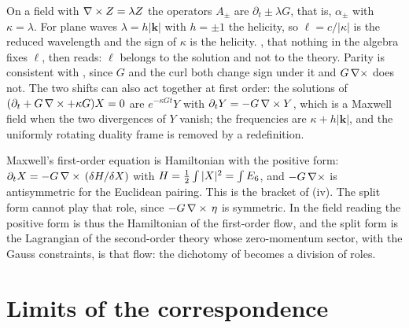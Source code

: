 \begin{remark}
\label{rem:rate}
On a field with $\nabla\times Z=\lambda Z$ the operators $A_\pm$ are $\partial_t\pm\lambda G$, that is, $\alpha_\pm$ with $\kappa=\lambda$. For
plane waves $\lambda=h|\mathbf k|$ with $h=\pm1$ the helicity, so $\ell=c/|\kappa|$ is the reduced wavelength and the sign of $\kappa$ is
the helicity. , that nothing in the algebra fixes $\ell$, then reads: $\ell$ belongs to the solution and not to the theory.
Parity is consistent with , since $G$ and the curl both change sign under it and $G\,\nabla\times$ does not. The two shifts can also
act together at first order: the solutions of $(\partial_t+G\,\nabla\times+\kappa G)X=0$ are $e^{-\kappa Gt}Y$ with $\partial_tY=-G\,\nabla\times Y$,
which is a Maxwell field when the two divergences of $Y$ vanish; the frequencies are $\kappa+h|\mathbf k|$, and the uniformly rotating
duality frame is removed by a redefinition.
\end{remark}

\begin{remark}
\label{rem:jobs}
Maxwell's first-order equation is Hamiltonian with the positive form: $\partial_tX=-G\,\nabla\times\,(\delta H/\delta X)$ with
$H=\tfrac12\int|X|^2=\int E_6$, and $-G\,\nabla\times$ is antisymmetric for the Euclidean pairing. This is the bracket of (iv). The
split form cannot play that role, since $-G\,\nabla\times\,\eta$ is symmetric. In the field reading the positive form is thus the Hamiltonian of
the first-order flow, and the split form is the Lagrangian of the second-order theory whose zero-momentum sector, with the Gauss
constraints, is that flow: the dichotomy of  becomes a division of roles.
\end{remark}

\section{Limits of the correspondence}
\label{sec:limits2}

